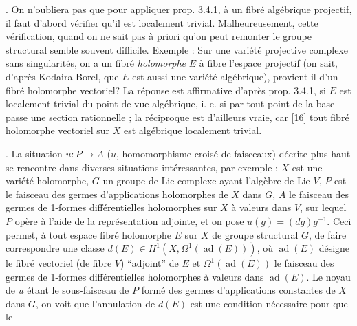 . On n'oubliera pas que pour appliquer prop. 3.4.1, à un fibré algébrique
projectif, il faut d'abord vérifier qu'il est localement trivial.
Malheureusement, cette vérification, quand on ne sait pas à priori qu'on peut
remonter le groupe structural semble souvent difficile.
Exemple : Sur une variété projective complexe sans singularités, on a un fibré
\textit{holomorphe} $E$ à fibre l'espace projectif (on sait, d'après
Kodaira-Borel, que $E$ est aussi une variété algébrique), provient-il d'un
fibré holomorphe vectoriel? La réponse est affirmative d'après prop. 3.4.1, si
$E$ est localement trivial du point de vue algébrique, i. e. si par tout point
de la base passe une section rationnelle ; la réciproque est d'ailleurs vraie,
car [16] tout fibré holomorphe vectoriel sur $X$ est algébrique localement
trivial.

. La situation $u:P\to A$ ($u$, homomorphisme croisé de
faisceaux) décrite plus haut se rencontre dans diverses situations
intéressantes, par exemple : $X$ est une variété holomorphe, $G$ un groupe de
Lie complexe ayant l'algèbre de Lie $V$, $P$ est le faisceau des germes
d'applications holomorphes de $X$ dans $G$, $A$ le faisceau des germes de
1-formes différentielles holomorphes sur $X$ à valeurs dans $V$, sur lequel
$P$ opère à l'aide de la représentation adjointe, et on pose
$u(g)=(dg)g^{-1}$.
Ceci permet, à tout espace fibré holomorphe $E$ sur $X$ de groupe structural
$G$, de faire correspondre
une classe
$d(E)\in H^1(X,\Omega^1(\operatorname{ad}(E)))$,
où $\operatorname{ad}(E)$ désigne le fibré vectoriel (de fibre $V$)
``adjoint'' de $E$ et $\Omega^1(\operatorname{ad}(E))$ le faisceau des
germes de 1-formes différentielles holomorphes à valeurs dans
$\operatorname{ad}(E)$.
Le noyau de $u$ étant le sous-faisceau de $P$ formé des germes d'applications
constantes de $X$ dans $G$, on voit que l'annulation de $d(E)$ est une
condition nécessaire pour que le

